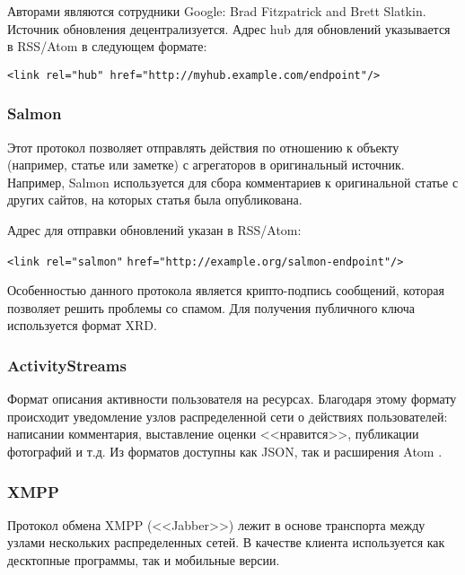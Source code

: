 \documentclass[10pt, a5paper]{article}
\begin{document}
    Авторами являются сотрудники Google: Brad Fitzpatrick and Brett
    Slatkin. Источник обновления децентрализуется. Адрес hub для
    обновлений указывается в RSS/Atom в следующем формате:

\noindent     \verb!<link rel="hub" href="http://myhub.example.com/endpoint"/>!


     \subsubsection*{Salmon}
    Этот протокол позволяет отправлять действия по отношению к объекту
    (например, статье или заметке) с агрегаторов в оригинальный
    источник. Например, Salmon используется для сбора комментариев к
    оригинальной статье с других сайтов, на которых статья была
    опубликована.

    Адрес для отправки обновлений указан в RSS/Atom:

\noindent        \verb!<link rel="salmon"! \linebreak
\verb!href="http://example.org/salmon-endpoint"/>!

    Особенностью данного протокола является крипто-подпись сообщений,
    которая позволяет решить проблемы со спамом. Для получения
    публичного ключа используется формат XRD.

    \subsubsection*{ActivityStreams}
    Формат описания активности пользователя на ресурсах. Благодаря этому
    формату происходит уведомление узлов распределенной сети о действиях
    пользователей: написании комментария, выставление оценки <<нравится>>,
    публикации фотографий и т.д. Из форматов доступны как JSON, так и
    расширения Atom \cite{zag4}.

    \subsubsection*{XMPP}
    Протокол обмена XMPP (<<Jabber>>) лежит в основе транспорта между
    узлами нескольких распределенных сетей. В качестве клиента
    используется как десктопные программы, так и мобильные версии.
\end{document}
